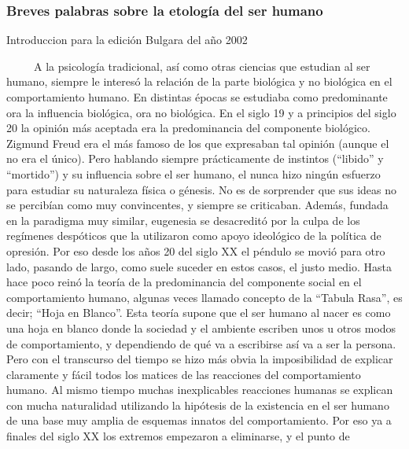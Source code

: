 \subsubsection*{Breves palabras sobre la etología del ser humano}
\label{breves-palabras-sobre-la-etologia-del-ser-humano}

\noindent
Introduccion para la edición Bulgara del año 2002

~ ~ ~ A la psicología tradicional, así como otras ciencias que estudian
al ser humano, siempre le interesó la relación de la parte biológica y
no biológica en el comportamiento humano. En distintas épocas se
estudiaba como predominante ora la influencia biológica, ora no
biológica. En el siglo 19 y a principios del siglo 20 la opinión más
aceptada era la predominancia del componente biológico. Zigmund Freud
era el más famoso de los que expresaban tal opinión (aunque el no era el
único). Pero hablando siempre prácticamente de instintos (``libido'' y
``mortido'') y su influencia sobre el ser humano, el nunca hizo ningún
esfuerzo para estudiar su naturaleza física o génesis. No es de
sorprender que sus ideas no se percibían como muy convincentes, y
siempre se criticaban. Además, fundada en la paradigma muy similar,
eugenesia se desacreditó por la culpa de los regímenes despóticos que la
utilizaron como apoyo ideológico de la política de opresión. Por eso
desde los años 20 del siglo XX el péndulo se movió para otro lado,
pasando de largo, como suele suceder en estos casos, el justo medio.
Hasta hace poco reinó la teoría de la predominancia del componente
social en el comportamiento humano, algunas veces llamado concepto de la
``Tabula Rasa'', es decir; ``Hoja en Blanco''. Esta teoría supone que el
ser humano al nacer es como una hoja en blanco donde la sociedad y el
ambiente escriben unos u otros modos de comportamiento, y dependiendo de
qué va a escribirse así va a ser la persona. Pero con el transcurso del
tiempo se hizo más obvia la imposibilidad de explicar claramente y fácil
todos los matices de las reacciones del comportamiento humano. Al mismo
tiempo muchas inexplicables reacciones humanas se explican con mucha
naturalidad utilizando la hipótesis de la existencia en el ser humano de
una base muy amplia de esquemas innatos del comportamiento. Por eso ya a
finales del siglo XX los extremos empezaron a eliminarse, y el punto de
